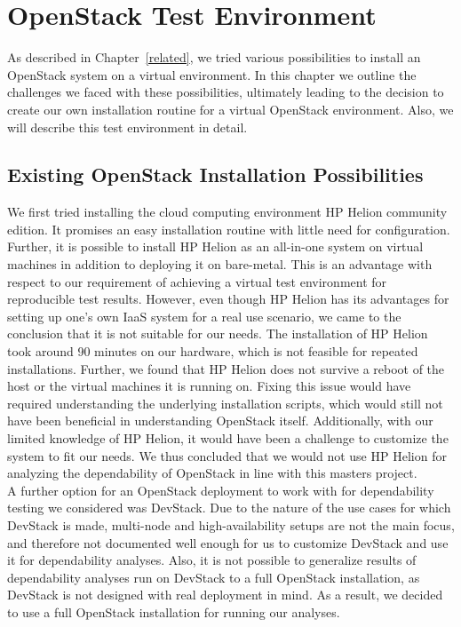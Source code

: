 \section[OpenStack Test Environment \texorpdfstring{{\textbf{\tiny \enspace (JE, SK, NK)}}}{}]{OpenStack Test Environment}
\label{environment}
As described in Chapter~\ref{related}, we tried various possibilities to install an OpenStack system on a virtual environment. In this chapter we outline the challenges we faced with these possibilities, ultimately leading to the decision to create our own installation routine for a virtual OpenStack environment. Also, we will describe this test environment in detail.\\

\subsection{Existing OpenStack Installation Possibilities}
\label{installpossibilities}
We first tried installing the cloud computing environment HP Helion community edition. It promises an easy installation routine with little need for configuration. Further, it is possible to install HP Helion as an all-in-one system on virtual machines in addition to deploying it on bare-metal. This is an advantage with respect to our requirement of achieving a virtual test environment for reproducible test results. However, even though HP Helion has its advantages for setting up one's own IaaS system for a real use scenario, we came to the conclusion that it is not suitable for our needs. The installation of HP Helion took around 90 minutes on our hardware, which is not feasible for repeated installations. Further, we found that HP Helion does not survive a reboot of the host or the virtual machines it is running on. Fixing this issue would have required understanding the underlying installation scripts, which would still not have been beneficial in understanding OpenStack itself. Additionally, with our limited knowledge of HP Helion, it would have been a challenge to customize the system to fit our needs. We thus concluded that we would not use HP Helion for analyzing the dependability of OpenStack in line with this masters project.\\

A further option for an OpenStack deployment to work with for dependability testing we considered was DevStack. Due to the nature of the use cases for which DevStack is made, multi-node and high-availability setups are not the main focus, and therefore not documented well enough for us to customize DevStack and use it for dependability analyses. Also, it is not possible to generalize results of dependability analyses run on DevStack to a full OpenStack installation, as DevStack is not designed with real deployment in mind. As a result, we decided to use a full OpenStack installation for running our analyses.\\

